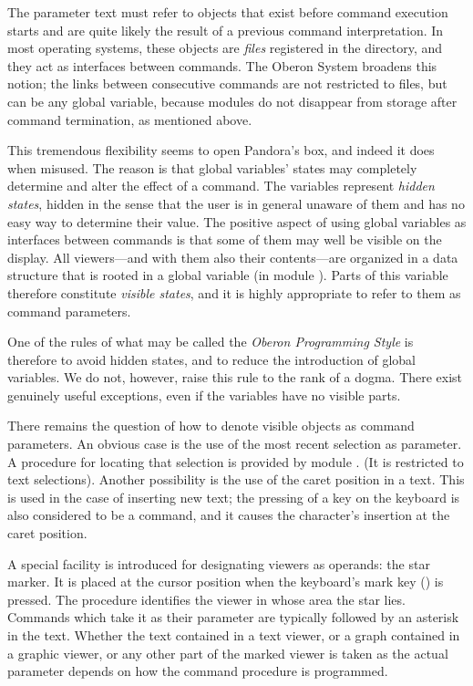 The parameter text must refer to objects that exist before command
execution starts and are quite likely the result of a previous command
interpretation. In most operating systems, these objects are \emph{files}
registered in the directory, and they act as interfaces between
commands. The Oberon System broadens this notion; the links between
consecutive commands are not restricted to files, but can be any
global variable, because modules do not disappear from storage after
command termination, as mentioned above.

This tremendous flexibility seems to open Pandora's box, and indeed it
does when misused. The reason is that global variables' states may
completely determine and alter the effect of a command. The variables
represent \emph{hidden states}, hidden in the sense that the user is in
general unaware of them and has no easy way to determine their
value. The positive aspect of using global variables as interfaces
between commands is that some of them may well be visible on the
display. All viewers---and with them also their contents---are
organized in a data structure that is rooted in a global variable (in
module ). Parts of this variable therefore constitute \emph{visible states},
and it is highly appropriate to refer to them as command
parameters.

One of the rules of what may be called the \emph{Oberon Programming Style} is
therefore to avoid hidden states, and to reduce the introduction of
global variables. We do not, however, raise this rule to the rank of a
dogma. There exist genuinely useful exceptions, even if the variables
have no visible parts.

There remains the question of how to denote visible objects as command
parameters. An obvious case is the use of the most recent selection as
parameter. A procedure for locating that selection is provided by
module . (It is restricted to text selections). Another
possibility is the use of the caret position in a text. This is used
in the case of inserting new text; the pressing of a key on the
keyboard is also considered to be a command, and it causes the
character's insertion at the caret position.

A special facility is introduced for designating viewers as operands:
the star marker. It is placed at the cursor position when the
keyboard's mark key () is pressed. The procedure
 identifies the viewer in whose area the star
lies. Commands which take it as their parameter are typically followed
by an asterisk in the text. Whether the text contained in a text
viewer, or a graph contained in a graphic viewer, or any other part of
the marked viewer is taken as the actual parameter depends on how the
command procedure is programmed.

